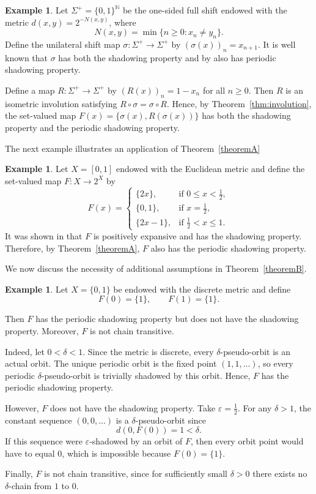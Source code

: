 \documentclass{amsart}
\theoremstyle{definition}
\newtheorem{ex}[theorem]{Example}
\begin{document}
\begin{ex}
Let $\Sigma^+=\{0,1\}^{\mathbb{N}}$ be the one-sided full shift endowed with the metric $d(x,y)=2^{-N(x,y)}$, where
\[
N(x,y)=\min\{n\geq 0 : x_n\neq y_n\}.
\]
Define the unilateral shift map $\sigma:\Sigma^+\to\Sigma^+$ by $(\sigma(x))_n=x_{n+1}$. It is well known that $\sigma$ has both the shadowing property and by \cite{DarabiForouzanfar2017} also has periodic shadowing property. 

Define a map $R:\Sigma^+\to\Sigma^+$ by $(R(x))_n=1-x_n$ for all $n\geq 0$. 
Then $R$ is an isometric involution satisfying $R\circ\sigma=\sigma\circ R$.
 Hence, by Theorem~\ref{thm:involution}, the set-valued map $
F(x)=\{\sigma(x),R(\sigma(x))\}$ has both the shadowing property and the periodic shadowing property.
\end{ex}


The next example illustrates an application of Theorem~\ref{theoremA}
\begin{ex}
Let $X=[0,1]$ endowed with the Euclidean metric and define the set-valued map
$F:X\to 2^X$ by
\[
F(x)=
\begin{cases}
\{2x\}, & \text{if } 0\leq x<\frac12,\\[0.2cm]
\{0,1\}, & \text{if } x=\frac12,\\[0.2cm]
\{2x-1\}, & \text{if } \frac12<x\leq 1.
\end{cases}
\]
It was shown in \cite{MMT} that $F$ is positively expansive and has the shadowing property. Therefore, by Theorem~\ref{theoremA}, $F$ also has the periodic shadowing property.
\end{ex}

We now discuss the necessity of additional assumptions in Theorem~\ref{theoremB}. 
\begin{ex}\label{example4.3} Let $X=\{0,1\}$ be endowed with the discrete metric and define
\[
F(0)=\{1\},
\qquad
F(1)=\{1\}.
\]

Then $F$ has the periodic shadowing property but does not have the shadowing property. Moreover, $F$ is not chain transitive.

Indeed, let $0<\delta<1$. Since the metric is discrete, every $\delta$-pseudo-orbit is an actual orbit. The unique periodic orbit is the fixed point $(1,1,\dots)$, so every periodic $\delta$-pseudo-orbit is trivially shadowed by this orbit. Hence, $F$ has the periodic shadowing property.

However, $F$ does not have the shadowing property. Take $\varepsilon=\frac12$. For any $\delta>1$, the constant sequence $(0,0,\dots)$ is a $\delta$-pseudo-orbit since
\[
d(0,F(0))=1<\delta.
\]
If this sequence were $\varepsilon$-shadowed by an orbit of $F$, then every orbit point would have to equal $0$, which is impossible because $F(0)=\{1\}$.

Finally, $F$ is not chain transitive, since for sufficiently small $\delta>0$ there exists no $\delta$-chain from $1$ to $0$.
\end{ex}
\end{document}
